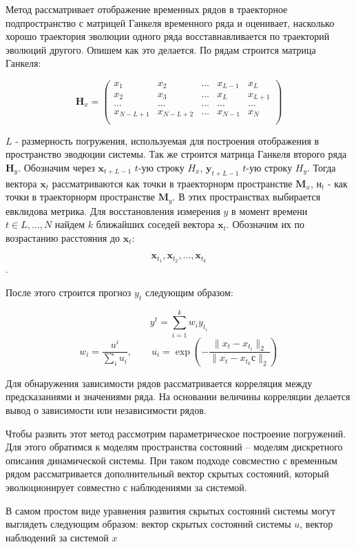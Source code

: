 \documentclass[12pt, twoside]{article}
\begin{document}
	Метод рассматривает отображение временных рядов в траекторное подпространство с матрицей Ганкеля временного ряда и оценивает, насколько хорошо траектория эволюции одного ряда восставнавливается по траекторий эволюций другого. Опишем как это делается. По рядам строится матрица Ганкеля:
	
	$$
	\mathbf{H}_{x} =
	\left( {\begin{array}{ccccc}
			x_1 & x_2 & ... & x_{L-1} & x_L\\
			x_2 & x_3 & ... & x_{L} & x_{L +1}\\
			... & ... & ... & ...   & ... \\
			x_{N-L+1} & x_{N-L +2} & ... & x_{N-1} & x_N\\
	\end{array} } \right)
	$$
	
	$L$ - размерность погружения, используемая для построения отображения в пространство эводюции системы. Так же строится матрица Ганкеля второго ряда $\mathbf{H}_y$.
	Обозначим через $\mathbf{x}_{t+L -1}$ $t$-ую строку $H_x$, $\mathbf{y}_{t+L -1}$ $t$-ую строку $H_y$. Тогда вектора $\mathbf{x}_t$ рассматриваются как точки в траекторнорм пространстве $\mathbf{M}_x$, $\mathbf{н}_t$ - как точки в траекторнорм пространстве $\mathbf{M}_y$. В этих пространствах выбирается евклидова метрика.
	Для восстановления измерения $y$ в момент времени $t\in L,..., N$ найдем $k$ ближайших соседей вектора $\mathbf{x}_t$. Обозначим их по возрастанию расстояния до $\mathbf{x}_t$:
	
	$$\mathbf{x}_{t_1}, \mathbf{x}_{t_2}, ...,\mathbf{x}_{t_k}$$. 
	
	После этого строится прогноз $y_t$ следующим образом:
	
	$$
	y^t = \sum^k_{i = 1}w_iy_{t_i}$$
	$$	w_i = \frac{u^i}{\sum_i u_i}, \qquad u_i = \exp(-\frac{\|x_t - x_{t_i}\|_2}{\|x_t - x_{t_k}с\|_2})
	$$
	
	Для обнаружения зависимости рядов рассматривается корреляция между предсказаниями и значениями ряда. На основании величины корреляции делается вывод о зависимости или независимости рядов.
	
	Чтобы развить этот метод рассмотрим параметрическое построение погружений. Для этого обратимся к моделям пространства состояний -- моделям дискретного описания динамической системы. При таком подходе совсместно с временным рядом рассматривается дополнительный вектор скрытых состояний, который эволюционирует совместно с наблюдениями за системой.
	
	В самом простом виде уравнения развития скрытых состояний системы могут выглядеть следующим образом: вектор скрытых состояний системы $u$, вектор наблюдений за системой $x$
\end{document}
